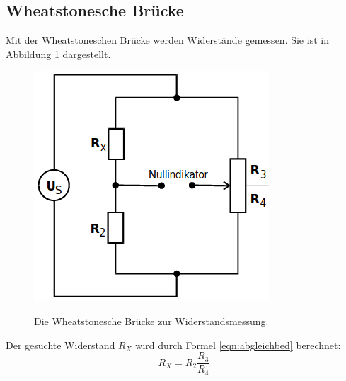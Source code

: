 \documentclass[titlepage = firstcover]{scrartcl}
\begin{document}
        \subsection{Wheatstonesche Brücke}
          Mit der Wheatstoneschen Brücke werden Widerstände gemessen. Sie ist in Abbildung \ref{fig:wheatstone} dargestellt.
          \begin{figure}[h]
            \centering
            \caption{Die Wheatstonesche Brücke zur Widerstandsmessung.}
            \includegraphics[width = 0.4\linewidth]{Wheatstonesche Bruecke.png}
            \label{fig:wheatstone}
          \end{figure}
          Der gesuchte Widerstand $R_X$ wird durch Formel \eqref{eqn:abgleichbed} berechnet:
          \begin{equation}
            \label{eqn:abgleichbed}
            R_X = R_2 \frac{R_3}{R_4}
          \end{equation}
\end{document}
